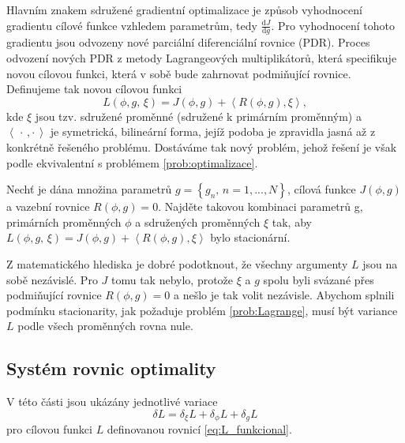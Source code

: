 Hlavním znakem sdružené gradientní optimalizace je způsob vyhodnocení gradientu cílové funkce vzhledem parametrům, tedy $ \frac{\mathrm{d}J}{\mathrm{d}g} $. 
Pro vyhodnocení tohoto gradientu jsou odvozeny nové parciální diferenciální rovnice (PDR).
Proces odvození nových PDR z metody Lagrangeových multiplikátorů, která specifikuje novou cílovou funkci, která v sobě bude zahrnovat podmiňující rovnice. 
Definujeme tak novou cílovou funkci 
\begin{equation}\label{eq:L_funkcional}
L(\phi, g,\,\xi) = J(\phi, g) + \left\langle R(\phi, g),\xi \right\rangle,
\end{equation}
kde $ \xi $ jsou tzv. sdružené proměnné (sdružené k primárním proměnným) a $  \left\langle \, \cdot\,,\cdot \,  \right\rangle $ je symetrická, bilineární forma, jejíž podoba je zpravidla jasná až z konkrétně řešeného problému.
Dostáváme tak nový problém, jehož řešení je však podle \cite{karman1997inverse} ekvivalentní s problémem \ref{prob:optimalizace}.

\begin{problem}\label{prob:Lagrange}
Nechť je dána množina parametrů $ g=\left\lbrace g_n, \, n=1,...,N\right\rbrace $, cílová funkce $ J(\phi, g) $ a vazební rovnice $ R(\phi, g)=0 $.
Najděte takovou kombinaci parametrů g, primárních proměnných $ \phi $ a sdružených proměnných $ \xi $ tak, aby $ L(\phi, g,\,\xi) = J(\phi, g) + \left\langle R(\phi, g),\xi \right\rangle$ bylo  stacionární.
\end{problem}

Z matematického hlediska je dobré podotknout, že všechny argumenty $ L $ jsou na sobě nezávislé. Pro $ J $ tomu tak nebylo, protože $ \xi $ a $ g $ spolu byli svázané přes podmiňující rovnice $ R(\phi, g)=0 $ a nešlo je tak volit nezávisle. Abychom splnili podmínku stacionarity, jak požaduje problém \ref{prob:Lagrange}, musí být variance $ L $ podle všech proměnných rovna nule.

\subsection{Systém rovnic optimality}
V této části jsou ukázány jednotlivé variace 
\begin{equation}\label{eq:L_variace}
\delta L = \delta_\xi L + \delta_\phi L + \delta_g L
\end{equation} 
pro cílovou funkci $ L $ definovanou rovnicí \ref{eq:L_funkcional}.
